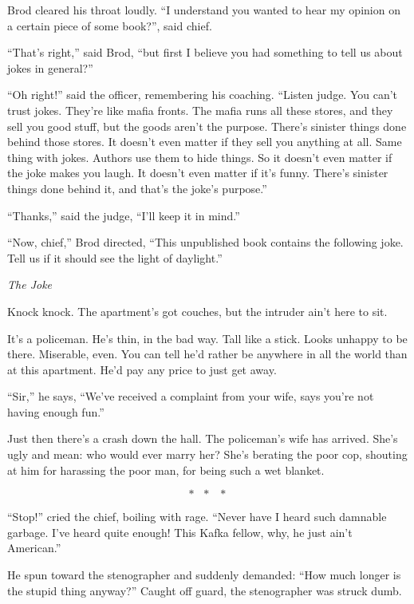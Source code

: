 \documentclass[oneside]{book}
\begin{document}
Brod cleared his throat loudly.
``I understand you wanted to hear my opinion on a certain
piece of some book?'', said chief.

``That's right,'' said Brod, ``but first I believe you had something to tell us about jokes in general?''

``Oh right!'' said the officer, remembering his coaching.  ``Listen judge.  You can't trust jokes.
They're like mafia fronts.  The mafia runs all these stores, and they sell you good stuff, but the goods aren't
the purpose.  There's sinister things done behind those stores.  It doesn't even matter if they
sell you anything at all.  Same thing with jokes.  Authors use them to hide things.  So it doesn't even matter
if the joke makes you laugh.  It doesn't even matter if it's funny.  There's sinister things done behind it,
and that's the joke's purpose.''

``Thanks,'' said the judge, ``I'll keep it in mind.''

``Now, chief,'' Brod directed, ``This unpublished book contains the following joke.  Tell us if it should
see the light of daylight.''

\vspace{2mm}
\noindent \textit{The Joke}
\vspace{2mm}

Knock knock.  The apartment's got couches, but the intruder ain't here to sit.

It's a policeman.  He's thin, in the bad way.
Tall like a stick.  Looks unhappy to be there.  Miserable, even.  You can tell he'd
rather be anywhere in all the world than at this apartment.  He'd pay any price to just
get away.

``Sir,'' he says, ``We've received a complaint from your wife, says you're not having enough fun.''

Just then there's a crash down the hall.  The policeman's wife has arrived.  She's ugly and mean: who would
ever marry her?  She's berating the poor cop, shouting at him for harassing the poor man, for being
such a wet blanket.

\[*\mbox{ }*\mbox{ }*\]

``Stop!'' cried the chief, boiling with rage.
``Never have I heard such damnable garbage.
I've heard quite enough!  This Kafka fellow, why, he just ain't American.''

He spun toward the stenographer and suddenly demanded:  ``How much longer
is the stupid thing anyway?''  Caught off guard, the stenographer was
struck dumb.
\end{document}
